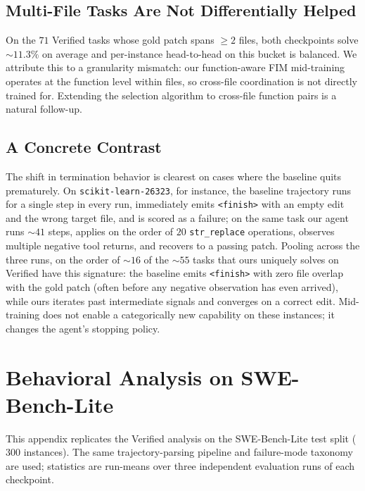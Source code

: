 \subsection{Multi-File Tasks Are Not Differentially Helped}
\label{app:behavior_extra:multifile}

On the $71$ Verified tasks whose gold patch spans $\geq 2$ files, both
checkpoints solve $\sim\!11.3\%$ on average and per-instance
head-to-head on this bucket is balanced. We attribute this to a
granularity mismatch: our function-aware FIM mid-training operates at
the function level within files, so cross-file coordination is not
directly trained for. Extending the selection algorithm to cross-file
function pairs is a natural follow-up.

\subsection{A Concrete Contrast}
\label{app:behavior_extra:contrast}

The shift in termination behavior is clearest on cases where the
baseline quits prematurely. On \texttt{scikit-learn-26323}, for
instance, the baseline trajectory runs for a single step in every run,
immediately emits \texttt{<finish>} with an empty edit and the wrong
target file, and is scored as a failure; on the same task our agent
runs $\sim\!41$ steps, applies on the order of $20$
\texttt{str\_replace} operations, observes multiple negative tool
returns, and recovers to a passing patch. Pooling across the three
runs, on the order of $\sim\!16$ of the $\sim\!55$ tasks that ours
uniquely solves on Verified have this signature: the baseline emits
\texttt{<finish>} with zero file overlap with the gold patch (often
before any negative observation has even arrived), while ours iterates
past intermediate signals and converges on a correct edit.
Mid-training does not enable a categorically new capability on these
instances; it changes the agent's stopping policy.

\section{Behavioral Analysis on SWE-Bench-Lite}
\label{app:behavior_lite}

This appendix replicates the Verified analysis on the SWE-Bench-Lite
test split ($300$ instances). The same trajectory-parsing pipeline and
failure-mode taxonomy are used; statistics are run-means over three
independent evaluation runs of each checkpoint.

